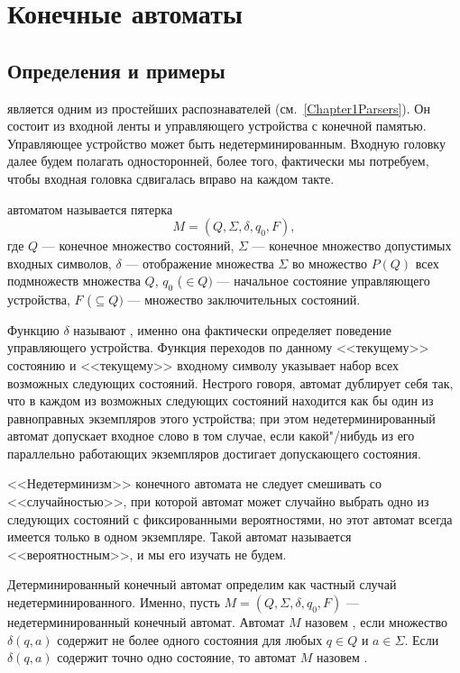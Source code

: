 \chapter{Конечные автоматы}
\label{Chapter3}
\section{Определения и примеры}
\label{Chapter3Defines}
 является одним из простейших
распознавателей (см.~\ref{Chapter1Parsers}). Он состоит из входной ленты и
управляющего устройства с конечной памятью. Управляющее
устройство может быть недетерминированным. Входную
головку далее будем полагать односторонней, более того,
фактически мы потребуем, чтобы входная головка сдвигалась
вправо на каждом такте.

 автоматом называется пятерка
\[
    M = (Q,\Sigma, \delta, q_0, F),
\]
где $Q$ --- конечное множество состояний, $\Sigma$ --- конечное
множество допустимых входных символов, $\delta$ --- отображение
множества $\Sigma$ во множество $P(Q)$ всех подмножеств множества $Q$,
$q_0$ ($\in Q)$ --- начальное состояние управляющего устройства,
$F$ ($\subseteq Q)$ --- множество заключительных состояний.

Функцию $\delta$ называют , именно она
фактически определяет поведение управляющего устройства. Функция
переходов по данному <<текущему>> состоянию и <<текущему>> входному
символу указывает набор всех возможных следующих состояний. Нестрого
говоря, автомат дублирует себя так, что в каждом из возможных следующих
состояний находится как бы один из равноправных экземпляров этого
устройства; при этом недетерминированный автомат допускает входное
слово в том случае, если какой"/нибудь из его параллельно работающих
экземпляров достигает допускающего состояния.

<<Недетерминизм>> конечного автомата не следует смешивать со
<<случайностью>>, при которой автомат может случайно выбрать одно из
следующих состояний с фиксированными вероятностями, но этот автомат
всегда имеется только в одном экземпляре. Такой автомат называется
<<вероятностным>>, и мы его изучать не будем.

Детерминированный конечный автомат определим как частный случай
недетерминированного. Именно, пусть $M = (Q,\Sigma,
\delta, q_0, F)$ --- недетерминированный конечный автомат. Автомат $M$
назовем , если множество $\delta(q,a)$
содержит не
более одного состояния для любых $q\in Q$ и $a\in\Sigma$. Если
$\delta(q,a)$ содержит точно одно состояние, то автомат $M$ назовем
.

